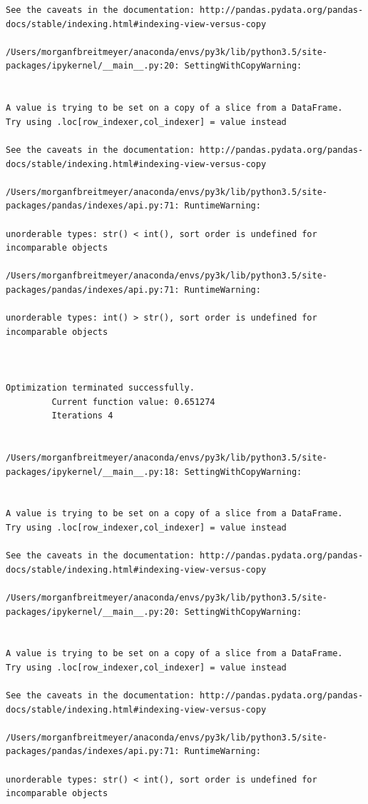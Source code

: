 \begin{lstlisting}
See the caveats in the documentation: http://pandas.pydata.org/pandas-docs/stable/indexing.html#indexing-view-versus-copy

/Users/morganfbreitmeyer/anaconda/envs/py3k/lib/python3.5/site-packages/ipykernel/__main__.py:20: SettingWithCopyWarning:


A value is trying to be set on a copy of a slice from a DataFrame.
Try using .loc[row_indexer,col_indexer] = value instead

See the caveats in the documentation: http://pandas.pydata.org/pandas-docs/stable/indexing.html#indexing-view-versus-copy

/Users/morganfbreitmeyer/anaconda/envs/py3k/lib/python3.5/site-packages/pandas/indexes/api.py:71: RuntimeWarning:

unorderable types: str() < int(), sort order is undefined for incomparable objects

/Users/morganfbreitmeyer/anaconda/envs/py3k/lib/python3.5/site-packages/pandas/indexes/api.py:71: RuntimeWarning:

unorderable types: int() > str(), sort order is undefined for incomparable objects



Optimization terminated successfully.
         Current function value: 0.651274
         Iterations 4


/Users/morganfbreitmeyer/anaconda/envs/py3k/lib/python3.5/site-packages/ipykernel/__main__.py:18: SettingWithCopyWarning:


A value is trying to be set on a copy of a slice from a DataFrame.
Try using .loc[row_indexer,col_indexer] = value instead

See the caveats in the documentation: http://pandas.pydata.org/pandas-docs/stable/indexing.html#indexing-view-versus-copy

/Users/morganfbreitmeyer/anaconda/envs/py3k/lib/python3.5/site-packages/ipykernel/__main__.py:20: SettingWithCopyWarning:


A value is trying to be set on a copy of a slice from a DataFrame.
Try using .loc[row_indexer,col_indexer] = value instead

See the caveats in the documentation: http://pandas.pydata.org/pandas-docs/stable/indexing.html#indexing-view-versus-copy

/Users/morganfbreitmeyer/anaconda/envs/py3k/lib/python3.5/site-packages/pandas/indexes/api.py:71: RuntimeWarning:

unorderable types: str() < int(), sort order is undefined for incomparable objects


\end{lstlisting}
